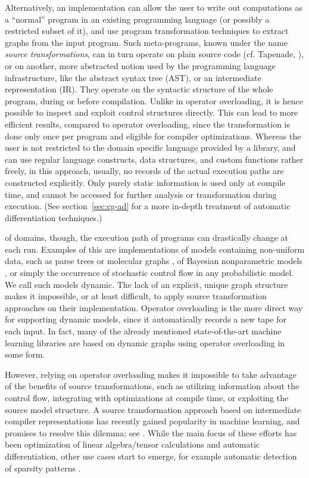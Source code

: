 Alternatively, an implementation can allow the user to write out computations as a \enquote{normal}
program in an existing programming language (or possibly a restricted subset of it), and use program
transformation techniques to extract graphs from the input program.  Such meta-programs, known under
the name \emph{source transformations}, can in turn operate on plain source code (cf. Tapenade,
\textcite{tapenadedevelopers2019tapenade}), or on another, more abstracted notion used by the
programming language infrastructure, like the abstract syntax tree (AST), or an intermediate
representation (IR).  They operate on the syntactic structure of the whole program, during or before
compilation.  Unlike in operator overloading, it is hence possible to inspect and exploit control
structures directly. This can lead to more efficient results, compared to operator overloading,
since the transformation is done only once per program and eligible for compiler optimizations.
Whereas the user is not restricted to the domain specific language provided by a library, and can
use regular language constructs, data structures, and custom functions rather freely, in this
approach, usually, no records of the actual execution paths are constructed explicitly.  Only purely
static information is used only at compile time, and cannot be accessed for further analysis or
transformation during execution.  (See section~\ref{sec:cg-ad} for a more in-depth treatment of
automatic differentiation techniques.)

 of domains, though, the execution path of programs can drastically change
at each run.  Examples of this are implementations of models containing non-uniform data, such as
parse trees \parencite{socher2011parsing} or molecular graphs \parencite{bianucci2000application},
of Bayesian nonparametric models \parencite{hjort2010bayesian}, or simply the occurrence of
stochastic control flow in any probabilistic model.  We call such models dynamic.  The lack of an
explicit, unique graph structure makes it impossible, or at least difficult, to apply source
transformation approaches on their implementation.  Operator overloading is the more direct way for
supporting dynamic models, since it automatically records a new tape for each input. In fact, many
of the already mentioned state-of-the-art machine learning libraries are based on dynamic graphs
using operator overloading in some form.

However, relying on operator overloading makes it impossible to take advantage of the benefits of
source transformations, such as utilizing information about the control flow, integrating with
optimizations at compile time, or exploiting the source model structure.  A source transformation
approach based on intermediate compiler representations has recently gained popularity in machine
learning, and promises to resolve this dilemma; see \textcite{bradbury2018jax,lattner2020mlir}.
While the main focus of these efforts has been optimization of linear algebra/tensor calculations
and automatic differentiation, other use cases start to emerge, for example automatic detection of
sparsity patterns \parencite{gowda2019sparsity}.

